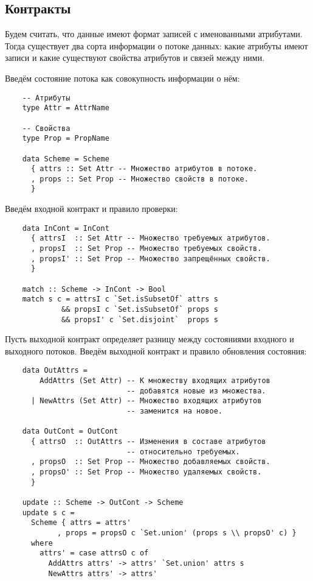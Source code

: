 \subsection{Контракты}

Будем считать, что данные имеют формат записей с именованными атрибутами.
Тогда существует два сорта информации о потоке данных: какие атрибуты имеют записи и какие существуют свойства атрибутов и связей между ними.

Введём состояние потока как совокупность информации о нём:
\begin{lstlisting}
    -- Атрибуты
    type Attr = AttrName

    -- Свойства
    type Prop = PropName

    data Scheme = Scheme
      { attrs :: Set Attr -- Множество атрибутов в потоке.
      , props :: Set Prop -- Множество свойств в потоке.
      }
\end{lstlisting}

Введём входной контракт и правило проверки:
\begin{lstlisting}
    data InCont = InCont
      { attrsI  :: Set Attr -- Множество требуемых атрибутов.
      , propsI  :: Set Prop -- Множество требуемых свойств.
      , propsI' :: Set Prop -- Множество запрещённых свойств.
      }

    match :: Scheme -> InCont -> Bool
    match s c = attrsI c `Set.isSubsetOf` attrs s
             && propsI c `Set.isSubsetOf` props s
             && propsI' c `Set.disjoint`  props s
\end{lstlisting}

Пусть выходной контракт определяет разницу между состояниями входного и выходного потоков. Введём выходной контракт и правило обновления состояния:

\begin{lstlisting}
    data OutAttrs =
        AddAttrs (Set Attr) -- К множеству входящих атрибутов
                            -- добавятся новые из множества.
      | NewAttrs (Set Attr) -- Множество входящих атрибутов
                            -- заменится на новое.

    data OutCont = OutCont
      { attrsO  :: OutAttrs -- Изменения в составе атрибутов
                            -- относительно требуемых.
      , propsO  :: Set Prop -- Множество добавляемых свойств.
      , propsO' :: Set Prop -- Множество удаляемых свойств.
      }

    update :: Scheme -> OutCont -> Scheme
    update s c =
      Scheme { attrs = attrs'
            , props = propsO c `Set.union' (props s \\ propsO' c) }
      where
        attrs' = case attrsO c of
          AddAttrs attrs' -> attrs' `Set.union' attrs s
          NewAttrs attrs' -> attrs'
\end{lstlisting}

